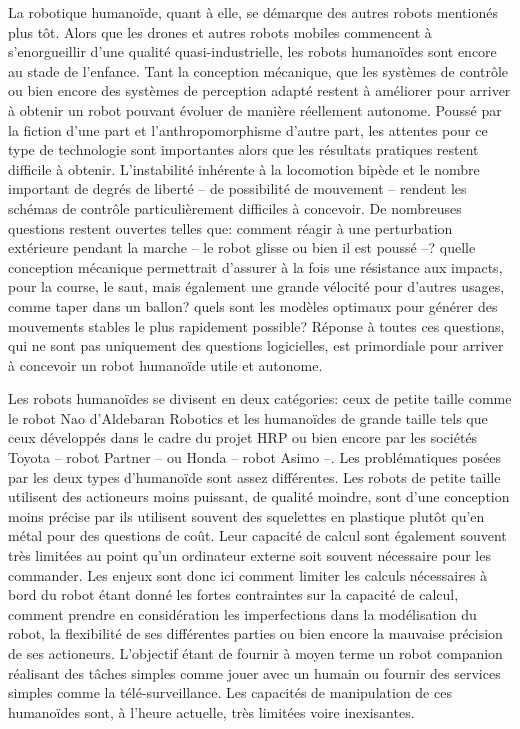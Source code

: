 La robotique humanoïde, quant à elle, se démarque des autres robots
mentionés plus tôt. Alors que les drones et autres robots mobiles
commencent à s'enorgueillir d'une qualité quasi-industrielle, les
robots humanoïdes sont encore au stade de l'enfance. Tant la
conception mécanique, que les systèmes de contrôle ou bien encore des
systèmes de perception adapté restent à améliorer pour arriver à
obtenir un robot pouvant évoluer de manière réellement
autonome. Poussé par la fiction d'une part et l'anthropomorphisme
d'autre part, les attentes pour ce type de technologie sont
importantes alors que les résultats pratiques restent difficile à
obtenir. L'instabilité inhérente à la locomotion bipède et le nombre
important de degrés de liberté -- de possibilité de mouvement --
rendent les schémas de contrôle particulièrement difficiles à
concevoir. De nombreuses questions restent ouvertes telles que:
comment réagir à une perturbation extérieure pendant la marche -- le
robot glisse ou bien il est poussé --? quelle conception mécanique
permettrait d'assurer à la fois une résistance aux impacts, pour la
course, le saut, mais également une grande vélocité pour d'autres
usages, comme taper dans un ballon? quels sont les modèles optimaux
pour générer des mouvements stables le plus rapidement possible?
Réponse à toutes ces questions, qui ne sont pas uniquement des
questions logicielles, est primordiale pour arriver à concevoir un
robot humanoïde utile et autonome.


Les robots humanoïdes se divisent en deux catégories: ceux de petite
taille comme le robot Nao d'Aldebaran Robotics et les humanoïdes de
grande taille tels que ceux développés dans le cadre du projet HRP ou
bien encore par les sociétés Toyota -- robot Partner -- ou Honda --
robot Asimo --. Les problématiques posées par les deux types
d'humanoïde sont assez différentes. Les robots de petite taille
utilisent des actioneurs moins puissant, de qualité moindre, sont
d'une conception moins précise par ils utilisent souvent des
squelettes en plastique plutôt qu'en métal pour des questions de
coût. Leur capacité de calcul sont également souvent très limitées au
point qu'un ordinateur externe soit souvent nécessaire pour les
commander. Les enjeux sont donc ici comment limiter les calculs
nécessaires à bord du robot étant donné les fortes contraintes sur la
capacité de calcul, comment prendre en considération les imperfections
dans la modélisation du robot, la flexibilité de ses différentes
parties ou bien encore la mauvaise précision de ses
actioneurs. L'objectif étant de fournir à moyen terme un robot
companion réalisant des tâches simples comme jouer avec un humain ou
fournir des services simples comme la télé-surveillance. Les capacités
de manipulation de ces humanoïdes sont, à l'heure actuelle, très
limitées voire inexisantes.


